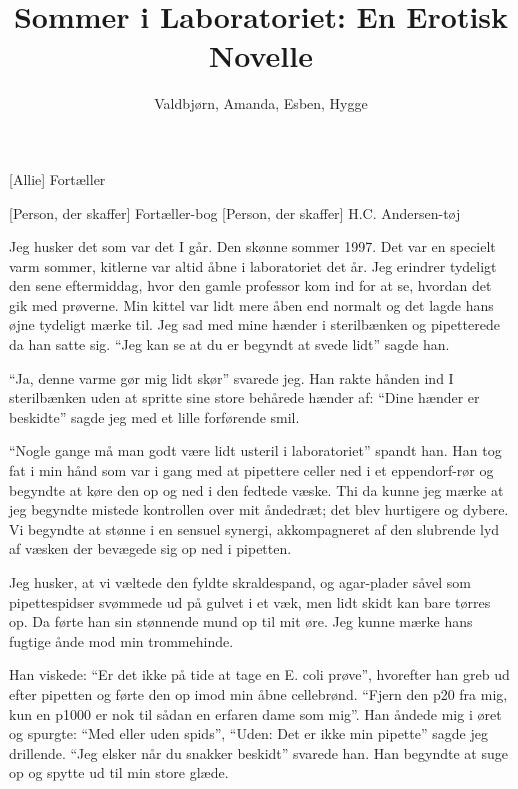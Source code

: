 \documentclass[a4paper,11pt]{article}
\title{Sommer i Laboratoriet: En Erotisk Novelle}
\author{Valdbjørn, Amanda, Esben, Hygge}
\begin{document}
\maketitle

\begin{roles}
    [Allie] Fortæller
\end{roles}

\begin{props}
    [Person, der skaffer] Fortæller-bog
    [Person, der skaffer] H.C. Andersen-tøj
\end{props}


\begin{sketch}


 Jeg husker det som var det I går. Den skønne sommer 1997. Det var en specielt varm sommer, kitlerne var altid åbne i laboratoriet det år. Jeg erindrer tydeligt den sene eftermiddag, hvor den gamle professor kom ind for at se, hvordan det gik med prøverne.
Min kittel var lidt mere åben end normalt og det lagde hans øjne tydeligt mærke til. Jeg sad med mine hænder i sterilbænken og pipetterede da han satte sig. ``Jeg kan se at du er begyndt at svede lidt'' sagde han.

``Ja, denne varme gør mig lidt skør'' svarede jeg. Han rakte hånden ind I sterilbænken uden at spritte sine store behårede hænder af: “Dine hænder er beskidte'' sagde jeg med et lille forførende smil.

``Nogle gange må man godt være lidt usteril i laboratoriet'' spandt han. Han tog fat i min hånd som var i gang med at pipettere celler ned i et eppendorf-rør og begyndte at køre den op og ned i den fedtede væske. Thi da kunne jeg mærke at jeg begyndte mistede kontrollen over mit åndedræt; det blev hurtigere og dybere. Vi begyndte at stønne i en sensuel synergi, akkompagneret af den slubrende lyd af væsken der bevægede sig op ned i pipetten.

Jeg husker, at vi væltede den fyldte skraldespand, og agar-plader såvel som pipettespidser svømmede ud på gulvet i et væk, men lidt skidt kan bare tørres op. Da førte han sin stønnende mund op til mit øre. Jeg kunne mærke hans fugtige ånde mod min trommehinde.

Han viskede: ``Er det ikke på tide at tage en E. coli prøve”, hvorefter han greb ud efter pipetten og førte den op imod min åbne cellebrønd. ``Fjern den p20 fra mig, kun en p1000 er nok til sådan en erfaren dame som mig''. Han åndede mig i øret og spurgte: ``Med eller uden spids'', ``Uden: Det er ikke min pipette'' sagde jeg drillende. ``Jeg elsker når du snakker beskidt'' svarede han. Han begyndte at suge op og spytte ud til min store glæde.


\end{sketch}
\end{document}
